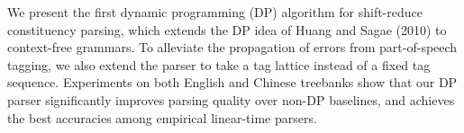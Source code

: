 We present the first dynamic programming (DP) algorithm for shift-reduce constituency parsing, which extends the DP idea of Huang and Sagae (2010) to context-free grammars. To alleviate the propagation of errors from part-of-speech tagging, we also extend the parser to take a tag lattice instead of a fixed tag sequence. Experiments on both English and Chinese treebanks show that our DP parser significantly improves parsing quality over non-DP baselines, and achieves the best accuracies among empirical linear-time parsers.
